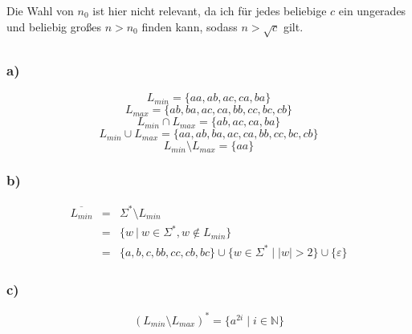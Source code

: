 \documentclass{article}
\begin{document}
   Die Wahl von $n_0$ ist hier nicht relevant, da ich f\"ur jedes beliebige $c$
   ein ungerades und beliebig gro\ss{}es $n > n_0$ finden kann, sodass $n >
   \sqrt{c}$ gilt.

   \subsection{} 

   \subsubsection{a)}

   \begin{equation*}
      L_{min} = \{aa, ab, ac, ca, ba\}
   \end{equation*}
   \begin{equation*}
      L_{max} = \{ab, ba, ac, ca, bb, cc, bc, cb\}
   \end{equation*}
   \begin{equation*}
      L_{min} \cap L_{max} = \{ab, ac, ca, ba\}
   \end{equation*}
   \begin{equation*}
      L_{min} \cup L_{max} = \{aa, ab, ba, ac, ca, bb, cc, bc, cb\}
   \end{equation*}
   \begin{equation*}
      L_{min} \setminus L_{max} = \{aa\}
   \end{equation*}
   \subsubsection{b)}

   \begin{eqnarray*}
      \overline{L_{min}} & = &  \Sigma^* \setminus L_{min} \\
                         & = & \{w~ |~ w \in \Sigma^*, w \not\in L_{min}\} \\
                         & = & \{a, b, c, bb, cc, cb, bc\} \cup \{ w \in
                               \Sigma^* \mid |w| > 2\} \cup \{\varepsilon\}
   \end{eqnarray*}
   \subsubsection{c)}
   
   \begin{equation*}
      \left(L_{min}\setminus L_{max}\right)^* = \{a^{2i} \mid i \in
      \mathbb{N}\}
   \end{equation*}
\end{document}
